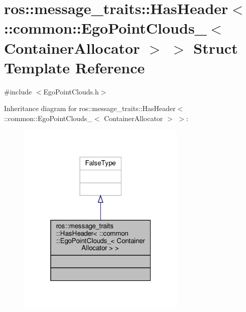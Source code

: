 \hypertarget{structros_1_1message__traits_1_1HasHeader_3_01_1_1common_1_1EgoPointClouds___3_01ContainerAllocator_01_4_01_4}{}\section{ros\+:\+:message\+\_\+traits\+:\+:Has\+Header$<$ \+:\+:common\+:\+:Ego\+Point\+Clouds\+\_\+$<$ Container\+Allocator $>$ $>$ Struct Template Reference}
\label{structros_1_1message__traits_1_1HasHeader_3_01_1_1common_1_1EgoPointClouds___3_01ContainerAllocator_01_4_01_4}


{\ttfamily \#include $<$Ego\+Point\+Clouds.\+h$>$}



Inheritance diagram for ros\+:\+:message\+\_\+traits\+:\+:Has\+Header$<$ \+:\+:common\+:\+:Ego\+Point\+Clouds\+\_\+$<$ Container\+Allocator $>$ $>$\+:\nopagebreak
\begin{figure}[H]
\begin{center}
\leavevmode
\includegraphics[width=229pt]{d1/d3e/structros_1_1message__traits_1_1HasHeader_3_01_1_1common_1_1EgoPointClouds___3_01ContainerAllocator_01_4_01_4__inherit__graph}
\end{center}
\end{figure}


